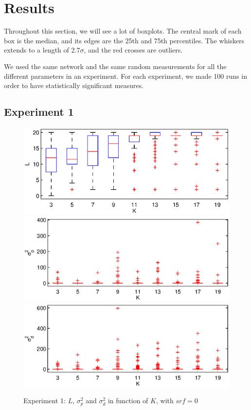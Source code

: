 \documentclass[letterpaper, 10 pt, conference]{ieeeconf}  %
\begin{document}
\section{Results}
Throughout this section, we will see a lot of boxplots. The central mark of each box is the median, and its edges are the 25th and 75th percentiles. The whiskers extends to a length of 2.7$\sigma$, and the red crosses are outliers.

We used the same network and the same random measurements for all the different parameters in an experiment. For each experiment, we made 100 runs in order to have statistically significant measures.

\subsection{Experiment 1}
\begin{figure}[ht!]
\centering
\includegraphics[width=1\columnwidth]{set1-L-nosrf.eps}
\includegraphics[width=1\columnwidth]{set1-sp-nosrf.eps}
\includegraphics[width=1\columnwidth]{set1-sd-nosrf.eps}
\caption{\label{figure:set1}Experiment 1: $L$, $\sigma_p^2$ and $\sigma_d^2$ in function of $K$, with $srf=0$}
\end{figure}
\end{document}
